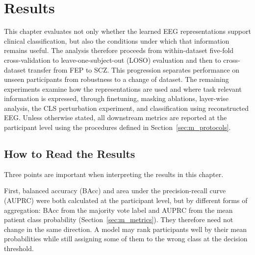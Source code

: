 
\chapter{Results}\label{ch:results}

This chapter evaluates not only whether the learned EEG representations support
clinical classification, but also the conditions under which that information
remains useful. The analysis therefore proceeds from within-dataset
five-fold cross-validation to leave-one-subject-out (LOSO) evaluation and then
to cross-dataset transfer from FEP to SCZ. This progression separates
performance on unseen participants from robustness to a change of dataset.
The remaining experiments examine how the representations are used and where
task relevant information is expressed, through finetuning, masking ablations,
layer-wise analysis, the CLS perturbation experiment, and
classification using reconstructed EEG. Unless otherwise stated, all
downstream metrics are reported at the participant level using the procedures
defined in Section~\ref{sec:m_protocols}.


\section{How to Read the Results}\label{sec:r_reading}

Three points are important when interpreting the results in this chapter.

First, balanced accuracy (BAcc) and area under the precision-recall curve
(AUPRC) were both calculated at the participant level, but by different forms of
aggregation: BAcc from the majority vote label and AUPRC from the mean patient
class probability (Section~\ref{sec:m_metrics}). They therefore need not change
in the same direction. A model may rank participants well by their mean
probabilities while still assigning some of them to the wrong class at the
decision threshold.

